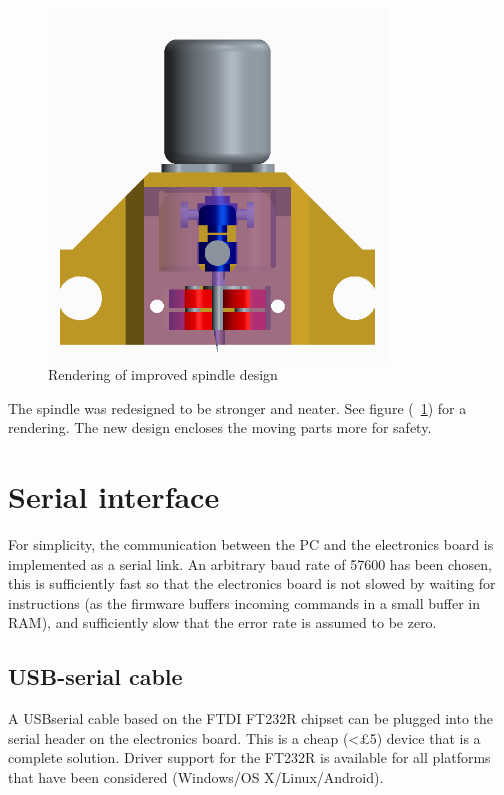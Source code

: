 \begin{figure}[ht!]
\centering
\includegraphics[width=90mm]{resources/spindle.png}
\caption{Rendering of improved spindle design}
\label{spindle}
\end{figure}

The spindle was redesigned to be stronger and neater. See figure (~\ref{spindle}) for a rendering.
The new design encloses the moving parts more for safety.

\section{Serial interface}
For simplicity, the communication between the PC and the electronics board is implemented as a serial link. An arbitrary baud rate of 57600 has been
chosen, this is sufficiently fast so that the electronics board is not slowed by waiting for instructions (as the firmware buffers incoming commands in
a small buffer in RAM), and sufficiently slow that the error rate is assumed to be zero.

\subsection{USB-serial cable}
A USBserial cable based on the FTDI FT232R chipset can be plugged into the serial header on the electronics board. This is a cheap (<\pounds 5) device that is 
a complete solution. Driver support for the FT232R is available for all platforms that have been considered (Windows/OS X/Linux/Android).


